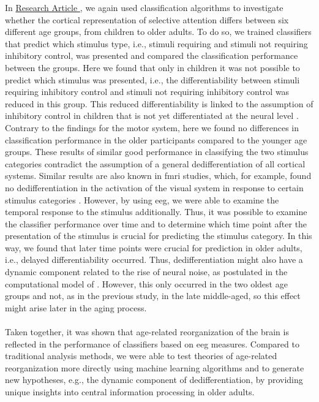 In \hyperref[results:paperII]{Research Article }, we again used classification algorithms to investigate whether the cortical representation of selective attention differs between six different age groups, from children to older adults. To do so, we trained classifiers that predict which stimulus type, i.e., stimuli requiring and stimuli not requiring inhibitory control, was presented and compared the classification performance between the groups. Here we found that only in children it was not possible to predict which stimulus was presented, i.e., the differentiability between stimuli requiring inhibitory control and stimuli not requiring inhibitory control was reduced in this group. This reduced differentiability is linked to the assumption of inhibitory control in children that is not yet differentiated at the neural level \cite{Waszak2010, Reuter2019}. Contrary to the findings for the motor system, here we found no differences in classification performance in the older participants compared to the younger age groups. These results of similar good performance in classifying the two stimulus categories contradict the assumption of a general dedifferentiation of all cortical systems. Similar results are also known in \gls{fmri} studies, which, for example, found no dedifferentiation in the activation of the visual system in response to certain stimulus categories \cite{Voss2008}. However, by using \gls{eeg}, we were able to examine the temporal response to the stimulus additionally. Thus, it was possible to examine the classifier performance over time and to determine which time point after the presentation of the stimulus is crucial for predicting the stimulus category. In this way, we found that later time points were crucial for prediction in older adults, i.e., delayed differentiability occurred. Thus, dedifferentiation might also have a dynamic component related to the rise of neural noise, as postulated in the computational model of \citeauthor{Li2001} \cite{Li2001, Li2000}. However, this only occurred in the two oldest age groups and not, as in the previous study, in the late middle-aged, so this effect might arise later in the aging process.\\
\\
Taken together, it was shown that age-related reorganization of the brain is reflected in the performance of classifiers based on \gls{eeg} measures. Compared to traditional analysis methods, we were able to test theories of age-related reorganization more directly using machine learning algorithms and to generate new hypotheses, e.g., the dynamic component of dedifferentiation, by providing unique insights into central information processing in older adults.\\

